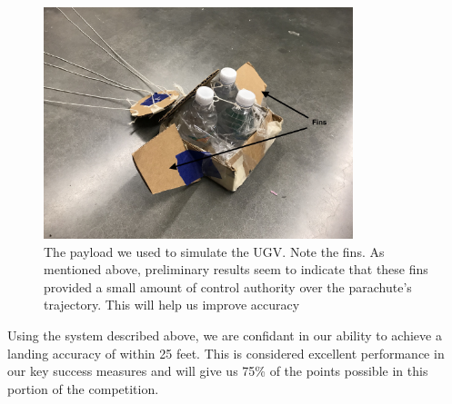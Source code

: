 \documentclass[]{auvsi_doc}
\begin{document}
\begin{figure}[ht]
\centering
\includegraphics[width=90mm]{./figs/Parachute_Fins.jpg}
\caption{The payload we used to simulate the UGV. Note the fins. As mentioned above, preliminary results seem to indicate that these fins provided a small amount of control authority over the parachute's trajectory. This will help us improve accuracy}
\label{fig:fins}
\end{figure}

Using the system described above, we are confidant in our ability to achieve a landing accuracy of within 25 feet. This is considered excellent performance in our key success measures and will give us 75\% of the points possible in this portion of the competition. 
\end{document}
